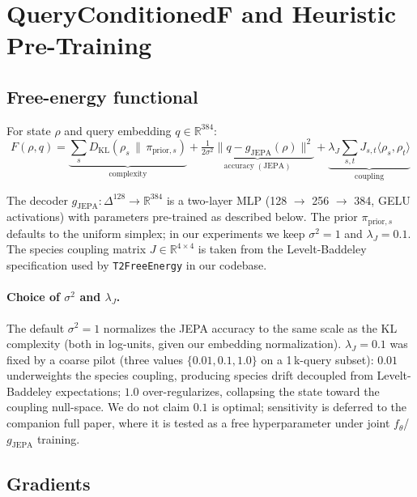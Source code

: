 \section{QueryConditionedF and Heuristic Pre-Training}
\label{sec:query-conditioned-f}

\subsection{Free-energy functional}

For state $\rho$ and query embedding $q \in \mathbb{R}^{384}$:
\begin{equation}
F(\rho, q) = \underbrace{\sum_{s} D_{\mathrm{KL}}(\rho_s \,\|\, \pi_{\mathrm{prior},s})}_{\mathrm{complexity}}
         + \underbrace{\tfrac{1}{2\sigma^2} \| q - g_{\mathrm{JEPA}}(\rho) \|^2}_{\mathrm{accuracy\;(JEPA)}}
         + \underbrace{\lambda_J \sum_{s,t} J_{s,t} \langle \rho_s, \rho_t \rangle}_{\mathrm{coupling}}
\label{eq:F}
\end{equation}

The decoder $g_{\mathrm{JEPA}} : \Delta^{128} \to \mathbb{R}^{384}$
is a two-layer MLP (128 $\to$ 256 $\to$ 384, GELU activations)
with parameters pre-trained as described below. The prior
$\pi_{\mathrm{prior}, s}$ defaults to the uniform simplex; in our
experiments we keep $\sigma^2 = 1$ and $\lambda_J = 0.1$. The
species coupling matrix $J \in \mathbb{R}^{4 \times 4}$ is taken
from the Levelt-Baddeley specification used by
\texttt{T2FreeEnergy} in our codebase.

\paragraph{Choice of $\sigma^2$ and $\lambda_J$.}
The default $\sigma^2 = 1$ normalizes the JEPA accuracy to the
same scale as the KL complexity (both in log-units, given our
embedding normalization). $\lambda_J = 0.1$ was fixed by a
coarse pilot (three values $\{0.01, 0.1, 1.0\}$ on a 1\,k-query
subset): $0.01$ underweights the species coupling, producing
species drift decoupled from Levelt-Baddeley expectations;
$1.0$ over-regularizes, collapsing the state toward the
coupling null-space. We do not claim $0.1$ is optimal;
sensitivity is deferred to the companion full paper, where it
is tested as a free hyperparameter under joint
$f_\theta$/$g_{\mathrm{JEPA}}$ training.

\subsection{Gradients}

